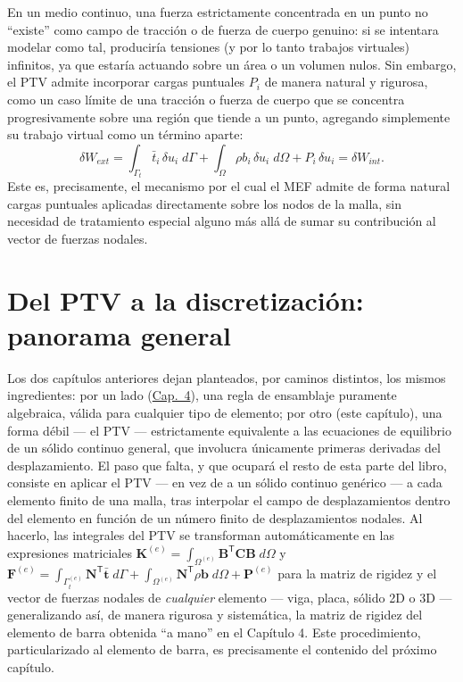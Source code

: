 \begin{observacion}
En un medio continuo, una fuerza estrictamente concentrada en un punto no ``existe'' como campo de tracción o de fuerza de cuerpo genuino: si se intentara modelar como tal, produciría tensiones (y por lo tanto trabajos virtuales) infinitos, ya que estaría actuando sobre un área o un volumen nulos. Sin embargo, el PTV admite incorporar cargas puntuales $P_i$ de manera natural y rigurosa, como un caso límite de una tracción o fuerza de cuerpo que se concentra progresivamente sobre una región que tiende a un punto, agregando simplemente su trabajo virtual como un término aparte:
\[
\delta W_{ext} = \int_{\Gamma_t}\bar t_i\,\delta u_i\;d\Gamma + \int_\Omega \rho b_i\,\delta u_i\;d\Omega + P_i\,\delta u_i = \delta W_{int} .
\]
Este es, precisamente, el mecanismo por el cual el MEF admite de forma natural cargas puntuales aplicadas directamente sobre los nodos de la malla, sin necesidad de tratamiento especial alguno más allá de sumar su contribución al vector de fuerzas nodales.
\end{observacion}

\section{Del PTV a la discretización: panorama general}

Los dos capítulos anteriores dejan planteados, por caminos distintos, los mismos ingredientes: por un lado (\hyperref[cap:cap04-analisis-matricial-barras]{Cap.\ 4}), una regla de ensamblaje puramente algebraica, válida para cualquier tipo de elemento; por otro (este capítulo), una forma débil --- el PTV --- estrictamente equivalente a las ecuaciones de equilibrio de un sólido continuo general, que involucra únicamente primeras derivadas del desplazamiento. El paso que falta, y que ocupará el resto de esta parte del libro, consiste en aplicar el PTV --- en vez de a un sólido continuo genérico --- a cada elemento finito de una malla, tras interpolar el campo de desplazamientos dentro del elemento en función de un número finito de desplazamientos nodales. Al hacerlo, las integrales del PTV se transforman automáticamente en las expresiones matriciales $\mathbf{K}^{(e)}=\int_{\Omega^{(e)}}\mathbf{B}^{\mathsf T}\mathbf{C}\mathbf{B}\;d\Omega$ y $\mathbf{F}^{(e)}=\int_{\Gamma_t^{(e)}}\mathbf{N}^{\mathsf T}\bar{\bm t}\;d\Gamma+\int_{\Omega^{(e)}}\mathbf{N}^{\mathsf T}\rho\bm b\;d\Omega+\mathbf{P}^{(e)}$ para la matriz de rigidez y el vector de fuerzas nodales de \emph{cualquier} elemento --- viga, placa, sólido 2D o 3D --- generalizando así, de manera rigurosa y sistemática, la matriz de rigidez del elemento de barra obtenida ``a mano'' en el Capítulo 4. Este procedimiento, particularizado al elemento de barra, es precisamente el contenido del próximo capítulo.

